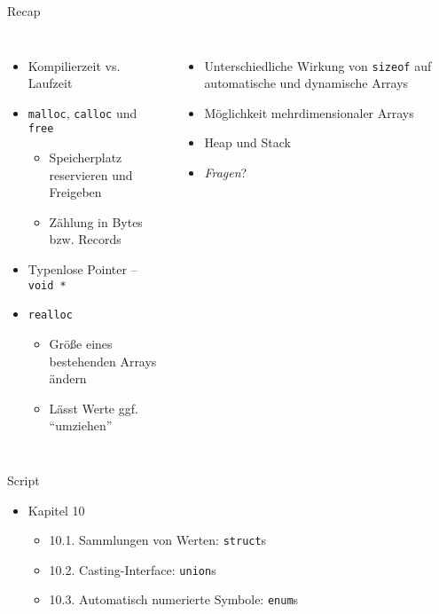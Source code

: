 
\begin{frame}[t,plain]
\titlepage
\end{frame}


\begin{frame}[fragile]{Recap}
%
\begin{columns}[T]
\begin{itemize}
\item Kompilierzeit vs. Laufzeit
\item \texttt{malloc}, \texttt{calloc} und \texttt{free}
	\begin{itemize}
	\item Speicherplatz reservieren und Freigeben
	\item Zählung in Bytes bzw. Records
	\end{itemize}
\item Typenlose Pointer -- \texttt{void *}
\item \texttt{realloc}
	\begin{itemize}
	\item Größe eines bestehenden Arrays ändern
	\item Lässt Werte ggf. \enquote{umziehen}
	\end{itemize}
\end{itemize}
%
\begin{itemize}
\item Unterschiedliche Wirkung von \texttt{sizeof} auf automatische und dynamische Arrays
\item Möglichkeit mehrdimensionaler Arrays
\item Heap und Stack
\item \emph{Fragen}?
\end{itemize}
\end{columns}
%
\end{frame}


\begin{frame}{Script}
%
\begin{itemize}
\item Kapitel 10
	\begin{itemize}
	\item 10.1. Sammlungen von Werten: \texttt{struct}s
	\item 10.2. Casting-Interface: \texttt{union}s
	\item 10.3. Automatisch numerierte Symbole: \texttt{enum}s
	\end{itemize}
\end{itemize}
%
\end{frame}

